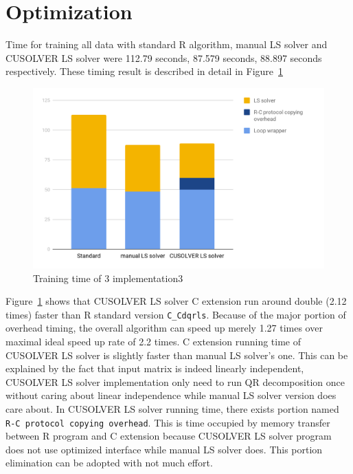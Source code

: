 \documentclass[English]{dicomopapers}
\begin{document}
\section{Optimization}
Time for training all data with standard R algorithm, manual LS solver and CUSOLVER LS solver were 112.79 seconds, 87.579 seconds, 88.897 seconds respectively. These timing result is described in detail in Figure~\ref{fig:qr_ret}\newline

\begin{figure}[ht]
  \centering
  \includegraphics[width=\textwidth/3,natwidth=1200,natheight=742]{qr_ret.png}
  \caption{Training time of 3 implementation3}\label{fig:qr_ret}
\end{figure}
Figure~\ref{fig:qr_ret} shows that CUSOLVER LS solver C extension run around double (2.12 times) faster than R standard version \texttt{C\_Cdqrls}. Because of the major portion of overhead timing, the overall algorithm can speed up merely 1.27 times over maximal ideal speed up rate of 2.2 times. C extension running time of CUSOLVER LS solver is slightly faster than manual LS solver's one. This can be explained by the fact that input matrix is indeed linearly independent, CUSOLVER LS solver implementation only need to run QR decomposition once without caring about linear independence while manual LS solver version does care about. In CUSOLVER LS solver running time, there exists portion named \texttt{R-C protocol copying overhead}. This is time occupied by memory transfer between R program and C extension because CUSOLVER LS solver program does not use optimized interface while manual LS solver does. This portion elimination can be adopted with not much effort.\newline
\end{document}
